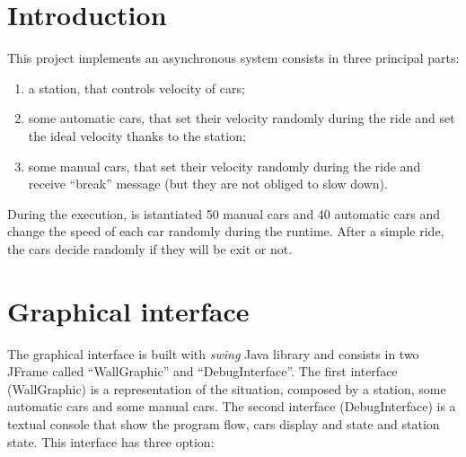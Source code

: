 \documentclass[a4paper,titlepage]{article}
\begin{document}
\begin{frontespizio}


\end{frontespizio}

\tableofcontents

\newpage

\part{Introduction}

This project implements an asynchronous system consists in three principal parts:

\begin{enumerate}

\item a station, that controls velocity of cars;

\item some automatic cars, that set their velocity randomly during the ride and set the ideal velocity thanks to the station;

\item some manual cars, that set their velocity randomly during the ride and receive ``break'' message (but they are not obliged to slow down).

\end{enumerate}

During the execution, is istantiated 50 manual cars and 40 automatic cars and change the speed of each car randomly during the runtime. After a simple ride, the cars decide randomly if they will be exit or not.

\newpage

\part{Graphical interface}

The graphical interface is built with \textit{swing} Java library and consists in two JFrame called ``WallGraphic'' and ``DebugInterface''. The first interface (WallGraphic) is a representation of the situation, composed by a station, some automatic cars and some manual cars. The second interface (DebugInterface) is a textual console that show the program flow, cars display and state and station state. This interface has three option:
\end{document}
